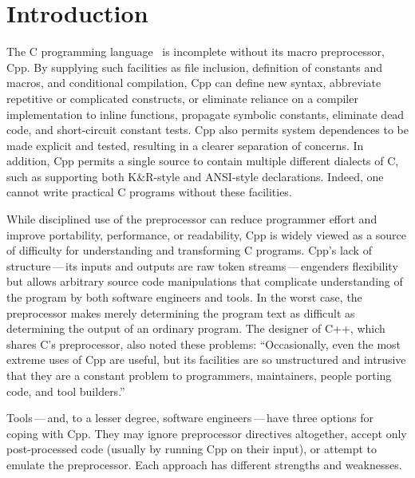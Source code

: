 \documentclass[10pt]{article}
\begin{document}
\section{Introduction}

The C programming language~\cite{KernighanR88,Harbison91} is incomplete
without its macro preprocessor, Cpp.  By supplying such facilities as file
inclusion, definition of constants and macros, and conditional compilation,
Cpp can define new syntax, abbreviate repetitive or complicated constructs,
or eliminate reliance on a compiler implementation to inline functions,
propagate symbolic constants, eliminate dead code, and short-circuit
constant tests.  Cpp also permits system dependences to be made explicit
and tested, resulting in a clearer separation of concerns.  In addition,
Cpp permits a single source to contain multiple different dialects of C,
such as supporting both K\&R-style and ANSI-style declarations.  Indeed,
one cannot write practical C programs without these facilities.

While disciplined use of the preprocessor can reduce programmer effort
and improve portability, performance, or readability, Cpp is widely
viewed as a source of difficulty for understanding and transforming C
programs.  Cpp's lack of structure\,---\,its inputs and
outputs are raw token streams\,---\,engenders flexibility but allows
arbitrary source code manipulations that complicate 
understanding of the program by both software engineers and tools.  In
the worst case, the preprocessor makes merely determining the program
text as difficult as determining the output of an ordinary program.
The designer of C++, which shares C's preprocessor, also noted these
problems: ``Occasionally, even the most extreme uses of Cpp are
useful, but its facilities are so unstructured and intrusive that they
are a constant problem to programmers, maintainers, people porting
code, and tool builders.''~\cite[p.~424]{Stroustrup-DesignEvolution}

Tools\,---\,and, to a lesser degree, software engineers\,---\,have
three options for coping with Cpp.  They may ignore preprocessor
directives altogether, accept only post-processed code (usually by
running Cpp on their input), or attempt to emulate the preprocessor.
Each approach has different strengths and weaknesses.
\end{document}
